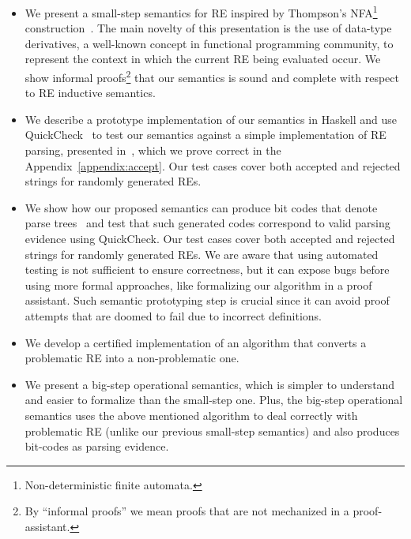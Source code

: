 \documentclass[oneside,12pt]{scrbook}
\theoremstyle{definition}
\theoremstyle{plain}
\theoremstyle{definition}
\begin{document}
\begin{itemize}
	\item We present a small-step semantics for RE inspired by  Thompson's NFA\footnote{Non-deterministic finite automata.}
	construction~\cite{Thompson1968}. The main novelty of this presentation is
	the use of data-type derivatives, a well-known concept in functional programming community, to represent
	the context in which the current RE being evaluated occur. We show informal proofs\footnote{By ``informal proofs'' we
		mean proofs that are not mechanized in a proof-assistant.} that our semantics is sound and complete with respect to RE inductive semantics.
	 \item We describe a prototype implementation of our semantics in Haskell and use QuickCheck~\cite{Claessen2000} to test our semantics
	 against a simple implementation of RE parsing, presented in~\cite{Fischer2010}, which we prove correct in the Appendix~\ref{appendix:accept}. 	Our test cases cover both accepted and rejected strings for randomly generated REs. 
	 \item We show how our proposed semantics can produce bit codes that denote parse trees~\cite{Lasse2011} and test that
	 such generated codes correspond to valid parsing evidence using QuickCheck.
	 Our test cases cover both accepted and rejected strings for randomly generated REs. We are aware that using automated testing is not sufficient to ensure correctness, but it can expose bugs before using more formal approaches,
	 like formalizing our algorithm in a proof assistant. Such semantic prototyping step is crucial since it can avoid proof attempts that are
	 doomed to fail due to incorrect definitions.
	 	\item We develop a certified implementation of an algorithm that converts a problematic RE into a non-problematic one.
	 \item We present a big-step operational semantics, which is simpler to understand and easier to formalize than the small-step one. Plus, the big-step operational semantics uses the above mentioned algorithm to deal correctly with problematic RE (unlike our previous small-step semantics) and also produces bit-codes as parsing evidence.


\end{itemize}
\end{document}
